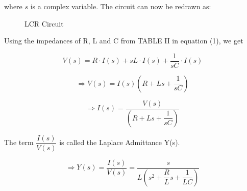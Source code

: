 \documentclass[journal,12pt,twocolumn]{IEEEtran}
\theoremstyle{remark}
\begin{document}
where $s$ is a complex variable. The circuit can now be redrawn as:

\begin{figure}[h]
 \centering
    
    \caption{LCR Circuit}
    \label{fig:enter-label}
\end{figure}

Using the impedances of R, L and C from TABLE II in equation (1), we get

\begin{equation}
    V(s) = R\cdot I(s) + sL\cdot I(s) + \dfrac{1}{sC}\cdot I(s)
\end{equation}

\begin{equation}
    \Rightarrow V(s) = I(s)\left(R + Ls + \dfrac{1}{sC}\right)
\end{equation}

\begin{equation}
    \Rightarrow I(s) = \dfrac{V(s)}{\left(R + Ls + \dfrac{1}{sC}\right)}
\end{equation}

The term $\dfrac{I(s)}{V(s)}$ is called the Laplace Admittance Y(s).

\begin{equation}
     \Rightarrow Y(s) = \dfrac{I(s)}{V(s)} = \dfrac{s}{L\left(s^2 + \dfrac{R}{L}s + \dfrac{1}{LC}\right)}
\end{equation}

\renewcommand{\thefigure}{\theenumi}
\renewcommand{\thetable}{\theenumi}
\end{document}
